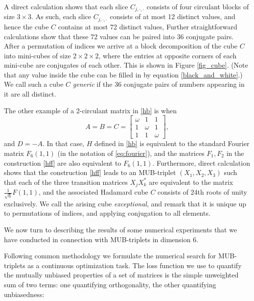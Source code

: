 \documentclass[12pt]{amsart}
\numberwithin{equation}{section}
\theoremstyle{definition}
\theoremstyle{remark}
\theoremstyle{remark}
\begin{document}
A direct calculation shows 
that each slice $C_{j, \cdot, \cdot}$ consists of four circulant blocks of size $3\times 3$. As such, each slice $C_{j, \cdot, \cdot}$ consists of at most 12 distinct values, and hence the cube $C$ contains at most 72 distinct values, 
Further straightforward calculations show that these 72 values can be paired into 36 conjugate pairs. After a permutation of indices we arrive at a block decomposition of the cube $C$ into mini-cubes of size $2\times 2\times 2$, where the entries at opposite corners of each mini-cube are conjugates of each other. This is shown in Figure \ref{fig_cube}. (Note that  any value inside the cube can be filled in by equation \eqref{black_and_white}.) We call such a  cube $C$ {\it generic} if the 36 conjugate pairs of numbers appearing in it are all distinct.


\medskip

The other example of a 2-circulant matrix in \ref{hb} is when 
$$
A=B=C=\begin{bmatrix}
    \omega      & 1  & 1\\
    1      & \omega  & 1 \\
    1     & 1 & \omega
\end{bmatrix},
$$
and $D=-A$. In that case, $H$ defined in \ref{hb} is equivalent to the standard Fourier matrix $F_6(1,1)$ (in the notation of \ref{eq:fourier}), and the matrices $F_1, F_2$ in the construction \ref{hff} are also equivalent to $F_6(1,1)$. Furthermore, direct calculation shows that the construction \ref{hff}  leads to an  MUB-triplet $(X_1, X_2, X_3)$ such that each of the three transition matrices $X_jX_k^\ast$ are equivalent to the matrix $\frac{1}{\sqrt{6}}F(1, 1)$, and the associated Hadamard cube $C$ consists of 24th roots of unity exclusively. We call the arising cube {\it exceptional}, and remark that it is unique up to  permutations of indices,
and applying conjugation to all elements. 

\medskip

We now turn to describing the results of some numerical experiments that we have conducted in connection with MUB-triplets in dimension 6.


\medskip

Following common methodology \cite{raynal, BBELTZ, BWB} we formulate the numerical search for MUB-triplets as a continuous optimization task. The loss function we use to quantify the mutually unbiased properties of a set of matrices is the simple unweighted sum of two terms: one quantifying orthogonality, the other quantifying unbiasedness:
\end{document}
